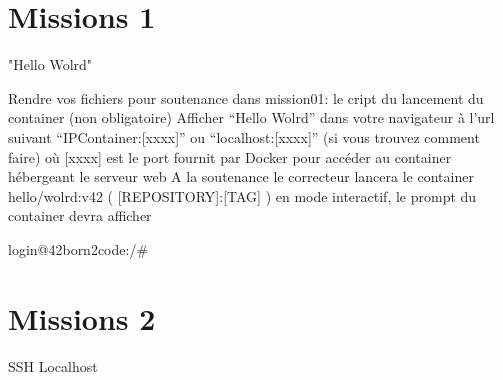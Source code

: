 \documentclass{42}
\begin{document}
\newpage

\section{Missions 1}
{\Huge "Hello Wolrd"}
\newline
\newline

Rendre vos fichiers pour soutenance dans mission01: le cript du lancement du container (non obligatoire)
\newline
\newline
Afficher “Hello Wolrd” dans votre navigateur à l’url suivant
    “IPContainer:[xxxx]” ou
“localhost:[xxxx]” (si vous trouvez comment faire)
où [xxxx] est le port fournit par Docker pour accéder au container hébergeant le serveur web
\newline
\newline
A la soutenance le correcteur lancera le container hello/wolrd:v42 ( [REPOSITORY]:[TAG] ) en mode interactif, le prompt du container devra afficher
\begin{42ccode}
login@42born2code:/#
\end{42ccode}

\newpage

\section{Missions 2}
{\Huge SSH Localhost}
\newline
\newline
\end{document}

